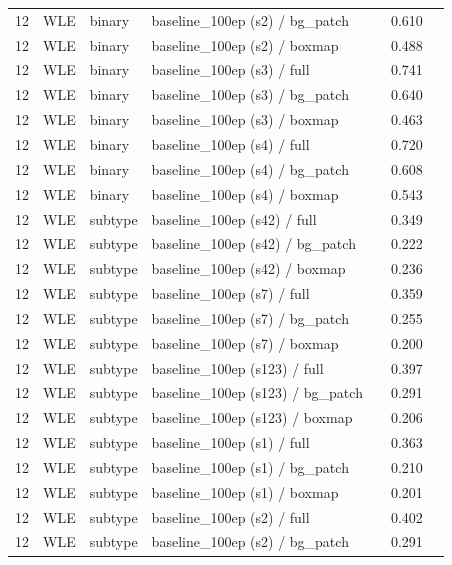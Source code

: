 \begin{longtable}{cL{1.1cm}L{1.5cm}L{5.6cm}ccc}
12 & WLE & binary & baseline\_100ep (s2) / bg\_patch & \nl{} & 0.610 & \nl{} \\
12 & WLE & binary & baseline\_100ep (s2) / boxmap & \nl{} & 0.488 & \nl{} \\
12 & WLE & binary & baseline\_100ep (s3) / full & \nl{} & 0.741 & \nl{} \\
12 & WLE & binary & baseline\_100ep (s3) / bg\_patch & \nl{} & 0.640 & \nl{} \\
12 & WLE & binary & baseline\_100ep (s3) / boxmap & \nl{} & 0.463 & \nl{} \\
12 & WLE & binary & baseline\_100ep (s4) / full & \nl{} & 0.720 & \nl{} \\
12 & WLE & binary & baseline\_100ep (s4) / bg\_patch & \nl{} & 0.608 & \nl{} \\
12 & WLE & binary & baseline\_100ep (s4) / boxmap & \nl{} & 0.543 & \nl{} \\
12 & WLE & subtype & baseline\_100ep (s42) / full & \nl{} & 0.349 & \nl{} \\
12 & WLE & subtype & baseline\_100ep (s42) / bg\_patch & \nl{} & 0.222 & \nl{} \\
12 & WLE & subtype & baseline\_100ep (s42) / boxmap & \nl{} & 0.236 & \nl{} \\
12 & WLE & subtype & baseline\_100ep (s7) / full & \nl{} & 0.359 & \nl{} \\
12 & WLE & subtype & baseline\_100ep (s7) / bg\_patch & \nl{} & 0.255 & \nl{} \\
12 & WLE & subtype & baseline\_100ep (s7) / boxmap & \nl{} & 0.200 & \nl{} \\
12 & WLE & subtype & baseline\_100ep (s123) / full & \nl{} & 0.397 & \nl{} \\
12 & WLE & subtype & baseline\_100ep (s123) / bg\_patch & \nl{} & 0.291 & \nl{} \\
12 & WLE & subtype & baseline\_100ep (s123) / boxmap & \nl{} & 0.206 & \nl{} \\
12 & WLE & subtype & baseline\_100ep (s1) / full & \nl{} & 0.363 & \nl{} \\
12 & WLE & subtype & baseline\_100ep (s1) / bg\_patch & \nl{} & 0.210 & \nl{} \\
12 & WLE & subtype & baseline\_100ep (s1) / boxmap & \nl{} & 0.201 & \nl{} \\
12 & WLE & subtype & baseline\_100ep (s2) / full & \nl{} & 0.402 & \nl{} \\
12 & WLE & subtype & baseline\_100ep (s2) / bg\_patch & \nl{} & 0.291 & \nl{} \\

\end{longtable}
